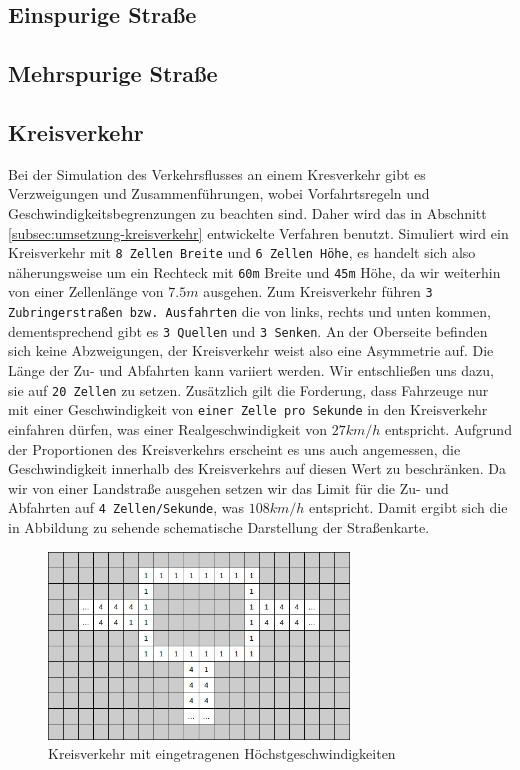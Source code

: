 \documentclass[11pt, a4paper]{article}
\begin{document}
\subsection{Einspurige Straße}
\subsection{Mehrspurige Straße}
\subsection{Kreisverkehr}
Bei der Simulation des Verkehrsflusses an einem Kresverkehr gibt es Verzweigungen und Zusammenführungen, wobei Vorfahrtsregeln und Geschwindigkeitsbegrenzungen zu beachten sind. Daher wird das in Abschnitt \ref{subsec:umsetzung-kreisverkehr} entwickelte Verfahren benutzt. Simuliert wird ein Kreisverkehr mit \texttt{8 Zellen Breite} und \texttt{6 Zellen Höhe}, es handelt sich also näherungsweise um ein Rechteck mit \texttt{60m} Breite und \texttt{45m} Höhe, da wir weiterhin von einer Zellenlänge von $7.5m$ ausgehen. Zum Kreisverkehr führen \texttt{3 Zubringerstraßen bzw. Ausfahrten} die von links, rechts und unten kommen, dementsprechend gibt es \texttt{3 Quellen} und \texttt{3 Senken}. An der Oberseite befinden sich keine Abzweigungen, der Kreisverkehr weist also eine Asymmetrie auf. Die Länge der Zu- und Abfahrten kann variiert werden. Wir entschließen uns dazu, sie auf \texttt{20 Zellen} zu setzen. Zusätzlich gilt die Forderung, dass Fahrzeuge nur mit einer Geschwindigkeit von \texttt{einer Zelle pro Sekunde} in den Kreisverkehr einfahren dürfen, was einer Realgeschwindigkeit von $27km/h$ entspricht. Aufgrund der Proportionen des Kreisverkehrs erscheint es uns auch angemessen, die Geschwindigkeit innerhalb des Kreisverkehrs auf diesen Wert zu beschränken. Da wir von einer Landstraße ausgehen setzen wir das Limit für die Zu- und Abfahrten auf \texttt{4 Zellen/Sekunde}, was $108km/h$ entspricht. Damit ergibt sich die in Abbildung  zu sehende schematische Darstellung der Straßenkarte.

\begin{figure}[h!]
	\centering
	\includegraphics[width=8cm]{img/roundaboutSmall}
	\caption{Kreisverkehr mit eingetragenen Höchstgeschwindigkeiten}
	\label{fig:roundaboutSmall}
\end{figure}
\end{document}
